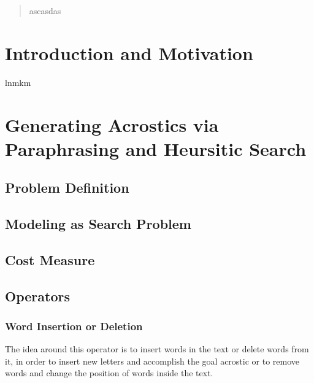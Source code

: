 \documentclass{reportAlternative}
\begin{document}
\begin{abstract}
ascasdas
\end{abstract}

\chapter{Introduction and Motivation}
lnmkm
\chapter{Generating Acrostics via Paraphrasing and Heursitic Search}

\section{Problem Definition}

\section{Modeling as Search Problem}

\section{Cost Measure}

\section{Operators}
\subsection{Word Insertion or Deletion}
The idea around this operator is to insert words in the text or delete words from it, in order to insert new letters and accomplish the goal acrostic or to remove words and change the position of words inside the text. \par
\end{document}
